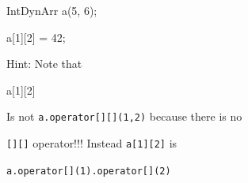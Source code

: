 \begin{console}

IntDynArr a(5, 6);

a[1][2] = 42;

\end{console}

Hint: Note that

\begin{console}

a[1][2]

\end{console}          

Is not \texttt{a.operator[][](1,2)} because there is no

\texttt{[][]} operator!!! Instead \texttt{a[1][2]} is

\texttt{a.operator[](1).operator[](2)}

